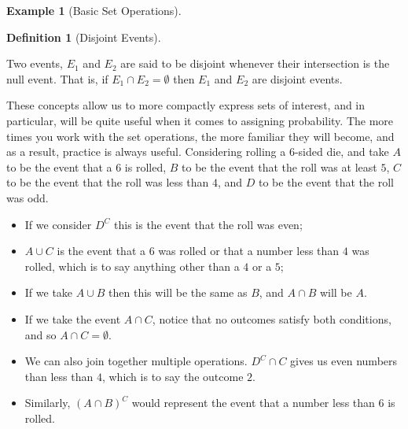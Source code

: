 \documentclass[
  letterpaper,
  DIV=11,
  numbers=noendperiod]{scrreprt}
\providecommand{\tightlist}{%
  \setlength{\itemsep}{0pt}\setlength{\parskip}{0pt}}\usepackage{longtable,booktabs,array}
\theoremstyle{definition}
\theoremstyle{definition}
\newtheorem{example}{Example}[chapter]
\theoremstyle{definition}
\newtheorem{definition}{Definition}[chapter]
\theoremstyle{remark}
\begin{document}
\begin{example}[Basic Set
Operations]
\begin{tcolorbox}[enhanced jigsaw, colback=white, colframe=quarto-callout-color-frame, arc=.35mm, leftrule=.75mm, rightrule=.15mm, opacityback=0, breakable, bottomrule=.15mm, left=2mm, toprule=.15mm]
\end{tcolorbox}



\end{example}

\begin{definition}[Disjoint
Events]\protect\hypertarget{def-disjoint-events}{}\label{def-disjoint-events}

Two events, \(E_1\) and \(E_2\) are said to be disjoint whenever their
intersection is the null event. That is, if \(E_1 \cap E_2 = \emptyset\)
then \(E_1\) and \(E_2\) are disjoint events.

\end{definition}

These concepts allow us to more compactly express sets of interest, and
in particular, will be quite useful when it comes to assigning
probability. The more times you work with the set operations, the more
familiar they will become, and as a result, practice is always useful.
Considering rolling a 6-sided die, and take \(A\) to be the event that a
\(6\) is rolled, \(B\) to be the event that the roll was at least \(5\),
\(C\) to be the event that the roll was less than \(4\), and \(D\) to be
the event that the roll was odd.

\begin{itemize}
\tightlist
\item
  If we consider \(D^C\) this is the event that the roll was even;
\item
  \(A \cup C\) is the event that a \(6\) was rolled or that a number
  less than \(4\) was rolled, which is to say anything other than a
  \(4\) or a \(5\);
\item
  If we take \(A \cup B\) then this will be the same as \(B\), and
  \(A\cap B\) will be \(A\).
\item
  If we take the event \(A\cap C\), notice that no outcomes satisfy both
  conditions, and so \(A \cap C = \emptyset\).
\item
  We can also join together multiple operations. \(D^C \cap C\) gives us
  even numbers than less than \(4\), which is to say the outcome \(2\).
\item
  Similarly, \((A \cap B)^C\) would represent the event that a number
  less than \(6\) is rolled.
\end{itemize}
\end{document}
